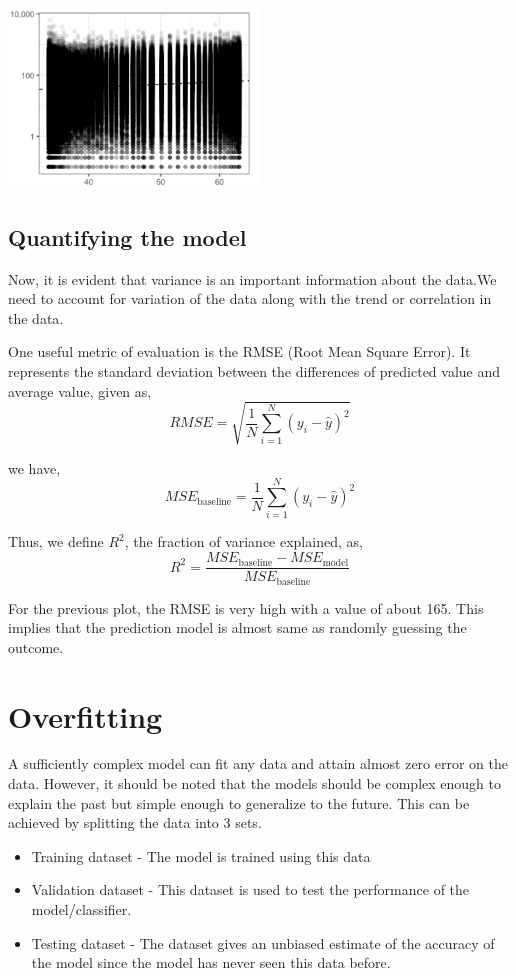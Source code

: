 \includegraphics[width=0.5\textwidth]{figures/var.PNG}

\subsection{Quantifying the model}
Now, it is evident that variance is an important information about the data.We need to account for variation of the data along with the trend or correlation in the data.

One useful metric of evaluation is the RMSE (Root Mean Square Error). It represents the standard deviation between the differences of predicted value and average value, given as,
\begin{equation}
    RMSE = \sqrt{\frac{1}{N}\sum_{i=1}^{N}(y_i - \hat{y})^2}
\end{equation}

we have,
\begin{equation}
    MSE_{\text{baseline}} = \frac{1}{N}\sum_{i=1}^{N}(y_i - \hat{y})^2
\end{equation}

Thus, we define $R^2$, the fraction of variance explained, as,
\begin{equation}
    R^2 = \frac{MSE_{\text{baseline}} - MSE_{\text{model}}}{MSE_{\text{baseline}}}
\end{equation}

For the previous plot, the RMSE is very high with a value of about 165. This implies that the prediction model is almost same as randomly guessing the outcome.

\section{Overfitting}

A sufficiently complex model can fit any data and attain almost zero error on the data. However, it should be noted that the models should be complex enough to explain the past but simple enough to generalize to the future. 
This can be achieved by splitting the data into 3 sets.
\begin{itemize}
  \item Training dataset - The model is trained using this data
  \item Validation dataset -  This dataset is used to test the performance of the model/classifier.
  \item Testing dataset -  The dataset gives an unbiased estimate of the accuracy of the model since the model has never seen this data before.
\end{itemize}


